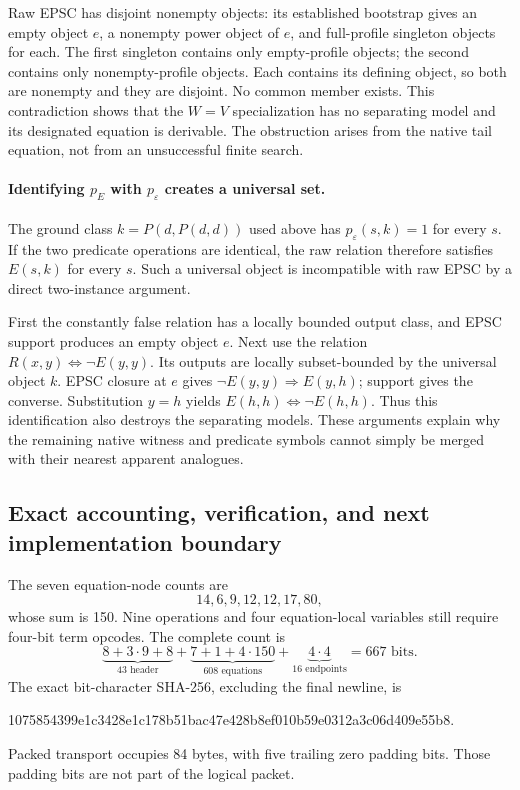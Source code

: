 Raw EPSC has disjoint nonempty objects: its established bootstrap
gives an empty object $e$, a nonempty power object of $e$, and
full-profile singleton objects for each.  The first singleton contains
only empty-profile objects; the second contains only nonempty-profile
objects.  Each contains its defining object, so both are nonempty
and they are disjoint.  No common member exists.  This contradiction
shows that the $W=V$ specialization has no separating model and its
designated equation is derivable.  The obstruction arises from the
native tail equation, not from an unsuccessful finite search.

\paragraph{Identifying $p_E$ with $p_\varepsilon$ creates a universal set.}
The ground class $k=P(d,P(d,d))$ used above has
$p_\varepsilon(s,k)=1$ for every $s$.  If the two predicate operations
are identical, the raw relation therefore satisfies $E(s,k)$ for
every $s$.  Such a universal object is incompatible with raw EPSC
by a direct two-instance argument.

First the constantly false relation has a locally bounded output
class, and EPSC support produces an empty object $e$.
Next use the relation $R(x,y)\Longleftrightarrow\neg E(y,y)$.
Its outputs are locally subset-bounded by the universal object $k$.
EPSC closure at $e$ gives
$\neg E(y,y)\Rightarrow E(y,h)$; support gives the converse.
Substitution $y=h$ yields $E(h,h)\Longleftrightarrow\neg E(h,h)$.
Thus this identification also destroys the separating models.
These arguments explain why the remaining native witness and predicate
symbols cannot simply be merged with their nearest apparent analogues.

\subsection{Exact accounting, verification, and next implementation boundary}

The seven equation-node counts are
\[
                   14,6,9,12,12,17,80,
\]
whose sum is 150.  Nine operations and four equation-local variables
still require four-bit term opcodes.  The complete count is
\[
 \underbrace{8+3\cdot9+8}_{43\text{ header}}
 +\underbrace{7+1+4\cdot150}_{608\text{ equations}}
 +\underbrace{4\cdot4}_{16\text{ endpoints}}
 =\boxed{667\text{ bits}}.
\]
The exact bit-character SHA-256, excluding the final newline, is
\begin{center}\scriptsize\ttfamily
1075854399e1c3428e1c178b51bac47e428b8ef010b59e0312a3c06d409e55b8.
\end{center}
Packed transport occupies 84 bytes, with five trailing zero padding
bits.  Those padding bits are not part of the logical packet.

